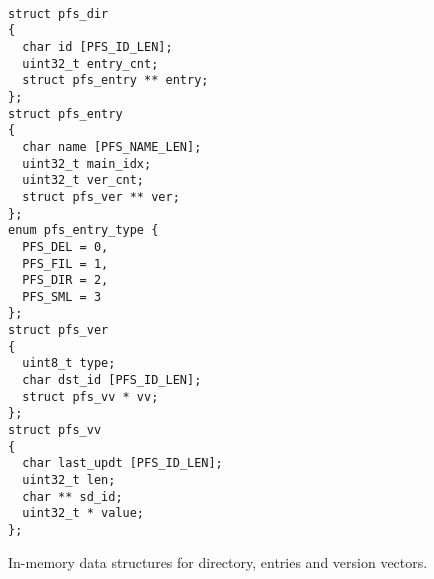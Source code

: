 \begin{figure}[t]
\begin{center}
{\tt \small
\begin{verbatim}
struct pfs_dir
{
  char id [PFS_ID_LEN];
  uint32_t entry_cnt;
  struct pfs_entry ** entry;
};
struct pfs_entry
{
  char name [PFS_NAME_LEN];
  uint32_t main_idx;
  uint32_t ver_cnt; 
  struct pfs_ver ** ver;
};
enum pfs_entry_type {
  PFS_DEL = 0,
  PFS_FIL = 1,
  PFS_DIR = 2,
  PFS_SML = 3 
};
struct pfs_ver
{
  uint8_t type;
  char dst_id [PFS_ID_LEN];
  struct pfs_vv * vv;
};
struct pfs_vv
{ 
  char last_updt [PFS_ID_LEN];
  uint32_t len;
  char ** sd_id;
  uint32_t * value;
};
\end{verbatim}
}
\end{center}
\caption{\label{MemStruct}
{\small In-memory data structures for directory, entries and version
  vectors.}}
\end{figure}

